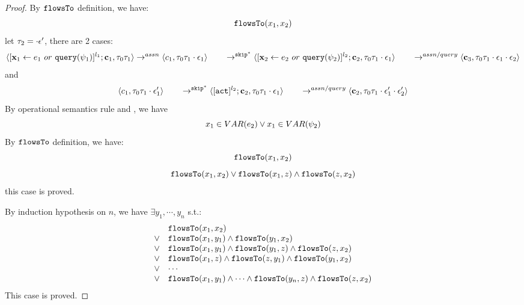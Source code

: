 \begin{proof}
%
By $\mathtt{flowsTo}$ definition, we have:
\[
\mathtt{flowsTo}(x_1, x_2)
\]
%
 let $\mathtt{\tau}_2 = \cdot \mathtt{\epsilon}'$, there are 2 cases:
\[
  \langle [\mathrel{ {\boldsymbol{\mathbf{x}}}_1 \leftarrow e_1~ or ~ {\tt query}(\psi_1) }]^{l_1} ; {\boldsymbol{\mathbf{c}}}_1, \mathtt{\tau}_0 \mathtt{\tau}_1 \rangle  \rightarrow^{assn}
\\ 
 \langle c_1, \mathtt{\tau}_0 \mathtt{\tau}_1 \cdot \mathtt{\epsilon}_1 \rangle 
  \qquad \rightarrow^{\mathtt{skip}^*} 
  \langle [\mathrel{ {\boldsymbol{\mathbf{x}}}_2 \leftarrow e_2 ~ or ~ {\tt query}(\psi_2) }]^{l_2};{\boldsymbol{\mathbf{c}}}_2, 
  \mathtt{\tau}_0 \mathtt{\tau}_1 \cdot \mathtt{\epsilon}_1 \rangle 
  \\
  \qquad \rightarrow^{assn/query} 
  \langle {\boldsymbol{\mathbf{c}}}_3,  \mathtt{\tau}_0 \mathtt{\tau}_1 \cdot \mathtt{\epsilon}_1\cdot \mathtt{\epsilon}_2 \rangle 
\]
and
\[
   \langle c_1, \mathtt{\tau}_0 \mathtt{\tau}_1 \cdot \mathtt{\epsilon}_1' \rangle 
  \qquad \rightarrow^{\mathtt{skip}^*} 
  \langle [\mathtt{act}]^{l_2} ; {\boldsymbol{\mathbf{c}}}_2, \mathtt{\tau}_0 \mathtt{\tau}_1 \cdot \mathtt{\epsilon}_1 \rangle 
  \\
  \qquad \rightarrow^{assn/query} 
  \langle {\boldsymbol{\mathbf{c}}}_2,  \mathtt{\tau}_0 \mathtt{\tau}_1 \cdot \mathtt{\epsilon}_1' \cdot \mathtt{\epsilon}_2' \rangle 
\]
By operational semantics rule  and , we have 
\[
  x_1 \in VAR(e_2) \lor x_1 \in VAR(\psi_2)
\]
By $\mathtt{flowsTo}$ definition, we have:
\[
\mathtt{flowsTo}(x_1, x_2)
\]
\[
  \mathtt{flowsTo}(x_1, x_2) \lor \mathtt{flowsTo}(x_1, z) \land \mathtt{flowsTo}(z, x_2)
\]
this case is proved.

By induction hypothesis on $n$, we have $\exists y_1, \cdots, y_n$ s.t.:
\[
\begin{array}{ll}
      & \mathtt{flowsTo}(x_1, x_2) \\
  \lor  & \mathtt{flowsTo}(x_1, y_1) \land \mathtt{flowsTo}(y_1, x_2)\\
  \lor  & \mathtt{flowsTo}(x_1, y_1) \land \mathtt{flowsTo}(y_1, z) \land \mathtt{flowsTo}(z, x_2) \\
  \lor  & \mathtt{flowsTo}(x_1, z) \land \mathtt{flowsTo}(z, y_1) \land \mathtt{flowsTo}(y_1, x_2) \\
  \lor  & \cdots \\
  \lor  & \mathtt{flowsTo}(x_1, y_1) \land \cdots \land \mathtt{flowsTo}(y_n, z) \land \mathtt{flowsTo}(z, x_2) \\
\end{array}
\]
This case is proved.
\end{proof}

